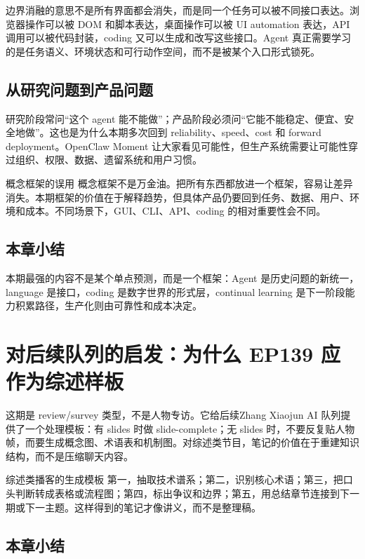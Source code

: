 \documentclass[a4paper]{article}
\begin{document}
边界消融的意思不是所有界面都会消失，而是同一个任务可以被不同接口表达。浏览器操作可以被 DOM 和脚本表达，桌面操作可以被 UI automation 表达，API 调用可以被代码封装，coding 又可以生成和改写这些接口。Agent 真正需要学习的是任务语义、环境状态和可行动作空间，而不是被某个入口形式锁死。

\subsection{从研究问题到产品问题}

研究阶段常问“这个 agent 能不能做”；产品阶段必须问“它能不能稳定、便宜、安全地做”。这也是为什么本期多次回到 reliability、speed、cost 和 forward deployment。OpenClaw Moment 让大家看见可能性，但生产系统需要让可能性穿过组织、权限、数据、遗留系统和用户习惯。

\begin{warningbox}{概念框架的误用}
概念框架不是万金油。把所有东西都放进一个框架，容易让差异消失。本期框架的价值在于解释趋势，但具体产品仍要回到任务、数据、用户、环境和成本。不同场景下，GUI、CLI、API、coding 的相对重要性会不同。
\end{warningbox}

\subsection{本章小结}

本期最强的内容不是某个单点预测，而是一个框架：Agent 是历史问题的新统一，language 是接口，coding 是数字世界的形式层，continual learning 是下一阶段能力积累路径，生产化则由可靠性和成本决定。

\section{对后续队列的启发：为什么 EP139 应作为综述样板}

这期是 review/survey 类型，不是人物专访。它给后续Zhang Xiaojun AI 队列提供了一个处理模板：有 slides 时做 slide-complete；无 slides 时，不要反复贴人物帧，而要生成概念图、术语表和机制图。对综述类节目，笔记的价值在于重建知识结构，而不是压缩聊天内容。

\begin{knowledgebox}{综述类播客的生成模板}
第一，抽取技术谱系；第二，识别核心术语；第三，把口头判断转成表格或流程图；第四，标出争议和边界；第五，用总结章节连接到下一期或下一主题。这样得到的笔记才像讲义，而不是整理稿。
\end{knowledgebox}

\subsection{本章小结}
\end{document}
